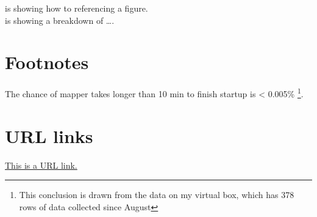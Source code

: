 \documentclass[12pt]{article}
\begin{document}
 is showing how to referencing a figure. \\
 is showing a breakdown of \dots.

\section*{Footnotes}
The chance of mapper takes longer than 10 min to finish startup is <
0.005\% \footnote{This conclusion is drawn from the data on my virtual box,
which has 378 rows of data collected since August}.

\section*{URL links}
\href{url}{This is a URL link.}
\end{document}
